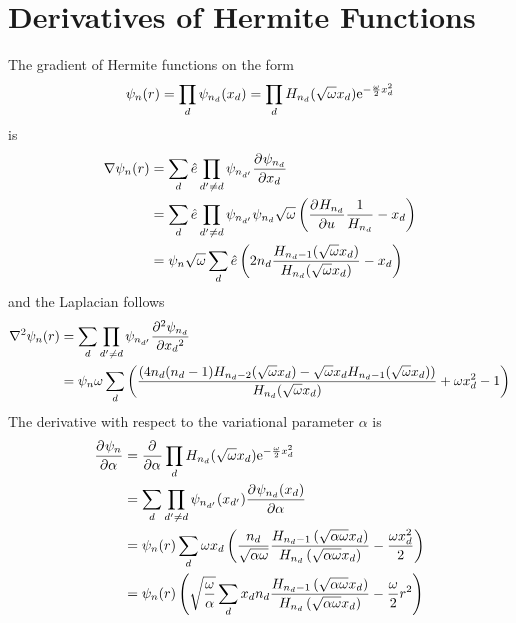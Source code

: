 \section{Derivatives of Hermite Functions}
    The gradient of Hermite functions on the form
        \begin{equation}
            \psi_n(r) = \prod_d \psi_{n_d}(x_d) = \prod_d
            H_{n_d}(\sqrt{\omega}x_d)\mathrm{e}^{-\frac{\omega}{2}x^2_d}
        \end{equation}
    is
        \begin{align}
            \nabla \psi_n(r) &= \sum_d\hat{e} \prod_{d'\neq d} \psi_{n_{d'}}
            \prd{x_d}[\psi_{n_d}] \nonumber \\
            &= \sum_d\hat{e} \prod_{d'\neq d} \psi_{n_{d'}} \psi_{n_d}
            \sqrt{\omega} \left(\prd{u}[H_{n_d}]\frac{1}{H_{n_d}} - x_d\right)
            \nonumber \\
            &= \psi_n\sqrt{\omega}\sum_d \hat{e}
            \left(2n_d\frac{H_{n_d-1}(\sqrt{\omega}x_d)}
            {H_{n_d}(\sqrt{\omega}x_d)} - x_d\right)
        \end{align}
    and the Laplacian follows
        \begin{align}
            \nabla^2 \psi_n(r) &= \sum_d \prod_{d'\neq d} \psi_{n_{d'}}
            \prd{x_d}[\psi_{n_d}][2] \nonumber \\
            &= \psi_n\omega\sum_d
            \left(\frac{\left(4n_d(n_d-1)H_{n_d-2}(\sqrt{\omega}x_d) -
            \sqrt{\omega}x_dH_{n_d-1}(\sqrt{\omega}x_d)\right)}
            {H_{n_d}(\sqrt{\omega}x_d)} + \omega x^2_d - 1\right)
        \end{align}
    The derivative with respect to the variational parameter $\alpha$ is
        \begin{align}
            \prd{\alpha}[\psi_n] &= \prd{\alpha} \prod_d
            H_{n_d}(\sqrt{\omega}x_d)\me^{-\frac{\omega}{2}x^2_d} \nonumber \\
            &= \sum_d \prod_{d'\neq d} \psi_{n_{d'}}(x_{d'})
            \prd{\alpha}[\psi_{n_d}(x_d)] \nonumber \\
            &= \psi_n(r)\sum_d \omega x_d\left(\frac{n_d}{\sqrt{\alpha\omega}}
            \frac{H_{n_d-1}\left(\sqrt{\alpha\omega}x_d\right)}
            {H_{n_d}\left(\sqrt{\alpha\omega}x_d\right)} - \frac{\omega
            x^2_d}{2}\right) \nonumber \\
            &= \psi_n(r)\left(\sqrt{\frac{\omega}{\alpha}} \sum_d x_dn_d
            \frac{H_{n_d-1}\left(\sqrt{\alpha\omega}x_d\right)}
            {H_{n_d}\left(\sqrt{\alpha\omega}x_d\right)} -
            \frac{\omega}{2}r^2\right)
        \end{align}

